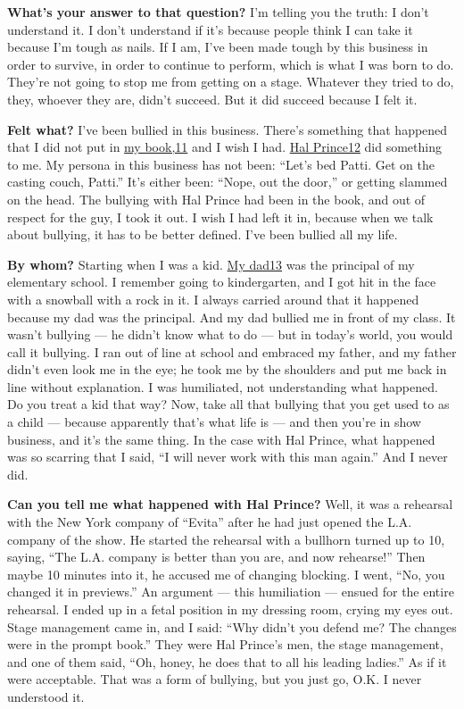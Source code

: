\textbf{What's your answer to that question?} I'm telling you the truth:
I don't understand it. I don't understand if it's because people think I
can take it because I'm tough as nails. If I am, I've been made tough by
this business in order to survive, in order to continue to perform,
which is what I was born to do. They're not going to stop me from
getting on a stage. Whatever they tried to do, they, whoever they are,
didn't succeed. But it did succeed because I felt it.

\textbf{Felt what?} I've been bullied in this business. There's
something that happened that I did not put in
\href{http://nytimes3xbfgragh.onion\#tooltip-11}{my book,11} and I wish
I had. \href{http://nytimes3xbfgragh.onion\#tooltip-12}{Hal Prince12}
did something to me. My persona in this business has not been: ``Let's
bed Patti. Get on the casting couch, Patti.'' It's either been: ``Nope,
out the door,'' or getting slammed on the head. The bullying with Hal
Prince had been in the book, and out of respect for the guy, I took it
out. I wish I had left it in, because when we talk about bullying, it
has to be better defined. I've been bullied all my life.

\textbf{By whom?} Starting when I was a kid.
\href{http://nytimes3xbfgragh.onion\#tooltip-13}{My dad13} was the
principal of my elementary school. I remember going to kindergarten, and
I got hit in the face with a snowball with a rock in it. I always
carried around that it happened because my dad was the principal. And my
dad bullied me in front of my class. It wasn't bullying --- he didn't
know what to do --- but in today's world, you would call it bullying. I
ran out of line at school and embraced my father, and my father didn't
even look me in the eye; he took me by the shoulders and put me back in
line without explanation. I was humiliated, not understanding what
happened. Do you treat a kid that way? Now, take all that bullying that
you get used to as a child --- because apparently that's what life is
--- and then you're in show business, and it's the same thing. In the
case with Hal Prince, what happened was so scarring that I said, ``I
will never work with this man again.'' And I never did.

\textbf{Can you tell me what happened with Hal Prince?} Well, it was a
rehearsal with the New York company of ``Evita'' after he had just
opened the L.A. company of the show. He started the rehearsal with a
bullhorn turned up to 10, saying, ``The L.A. company is better than you
are, and now rehearse!'' Then maybe 10 minutes into it, he accused me of
changing blocking. I went, ``No, you changed it in previews.'' An
argument --- this humiliation --- ensued for the entire rehearsal. I
ended up in a fetal position in my dressing room, crying my eyes out.
Stage management came in, and I said: ``Why didn't you defend me? The
changes were in the prompt book.'' They were Hal Prince's men, the stage
management, and one of them said, ``Oh, honey, he does that to all his
leading ladies.'' As if it were acceptable. That was a form of bullying,
but you just go, O.K. I never understood it.

